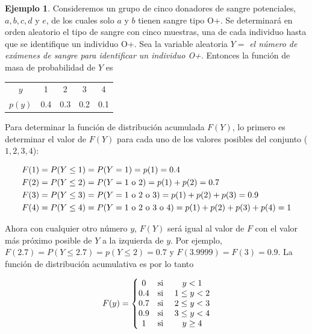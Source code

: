 \documentclass[
  11pt,
]{book}
\theoremstyle{definition}
\theoremstyle{definition}
\newtheorem{example}{Ejemplo}[chapter]
\theoremstyle{definition}
\theoremstyle{definition}
\theoremstyle{remark}
\begin{document}
\begin{example}
Consideremos un grupo de cinco donadores de sangre potenciales, \(a, b, c, d\) y \(e\), de los cuales solo \(a\) y \(b\) tienen sangre tipo O+. Se determinará en orden aleatorio el tipo de sangre con cinco muestras, una de cada individuo hasta que se identifique un individuo O+. Sea la variable aleatoria \(Y =\) \emph{el número de exámenes de sangre para identificar un individuo O+}. Entonces la función de masa de probabilidad de \(Y\) es

\begin{table}[H]
\centering
\begin{tabular}[t]{ccccc}
\toprule
$y$ & 1 & 2 & 3 & 4\\
$p(y)$ & 0.4 & 0.3 & 0.2 & 0.1\\
\bottomrule
\end{tabular}
\end{table}

Para determinar la función de distribución acumulada \(F(Y)\), lo primero es determinar el valor de \(F(Y)\) para cada uno de los valores posibles del conjunto (\(1,2,3,4\)):

\begin{equation}
\notag
\begin{split}
F(1) &= P(Y\leq 1) = P(Y = 1) = p(1) = 0.4\\
F(2) &= P(Y\leq 2) = P(Y = 1 \text{ o } 2) = p(1) + p(2) = 0.7\\
F(3) &= P(Y\leq 3) = P(Y = 1 \text{ o } 2 \text{ o } 3) = p(1) + p(2) + p(3) = 0.9\\
F(4) &= P(Y\leq 4) = P(Y = 1 \text{ o } 2 \text{ o } 3 \text{ o } 4) = p(1) + p(2) + p(3) + p(4) = 1\\
\end{split}
\end{equation}

Ahora con cualquier otro número \(y\), \(F(Y)\) será igual al valor de \(F\) con el valor más próximo posible de \(Y\) a la izquierda de \(y\). Por ejemplo, \(F(2.7) = P(Y\leq 2.7) = p(Y\leq 2) = 0.7\) y \(F(3.9999) = F(3) = 0.9\). La función de distribución acumulativa es por lo tanto

\begin{equation}
\notag
\begin{split}
F(y) = \left\lbrace
\begin{matrix}
0 & \text{si } & y < 1\\
0.4 & \text{si } & 1\leq y < 2\\
0.7 & \text{si } & 2\leq y < 3\\
0.9 & \text{si } & 3\leq y < 4\\
1 & \text{si } & y\geq 4\\
\end{matrix}
\right.
\end{split}
\end{equation}


\end{example}
\end{document}

